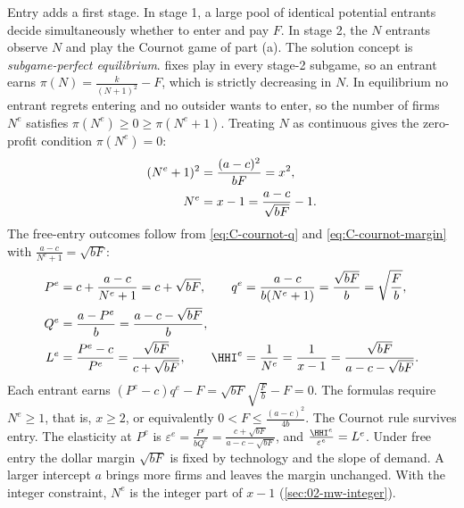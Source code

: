 Entry adds a first stage. In stage 1, a large pool of identical potential entrants decide simultaneously
whether to enter and pay $F$. In stage 2, the $N$ entrants observe $N$ and play the Cournot game of part (a).
The solution concept is \emph{subgame-perfect equilibrium}.  fixes play in every
stage-2 subgame, so an entrant earns $\pi(N) = \frac{k}{(N + 1)^2} - F$, which is strictly decreasing in $N$.
In equilibrium no entrant regrets entering and no outsider wants to enter, so the number of firms $N^e$
satisfies $\pi(N^e) \ge 0 \ge \pi(N^e + 1)$. Treating $N$ as continuous gives the zero-profit condition
$\pi(N^e) = 0$:
\begin{align}
(N^e + 1)^2 &= \frac{(a - c)^2}{bF} = x^2, \notag\\
N^e &= x - 1 = \frac{a - c}{\sqrt{bF}} - 1 . \label{eq:C-Ne}
\end{align}
The free-entry outcomes follow from \eqref{eq:C-cournot-q} and \eqref{eq:C-cournot-margin} with
$\frac{a - c}{N^e + 1} = \sqrt{bF}$:
\begin{align}
P^e &= c + \frac{a - c}{N^e + 1} = c + \sqrt{bF}, \qquad
q^e = \frac{a - c}{b(N^e + 1)} = \frac{\sqrt{bF}}{b} = \sqrt{\frac{F}{b}}, \notag\\
Q^e &= \frac{a - P^e}{b} = \frac{a - c - \sqrt{bF}}{b}, \notag\\
L^e &= \frac{P^e - c}{P^e} = \frac{\sqrt{bF}}{c + \sqrt{bF}}, \qquad
\HHI^e = \frac{1}{N^e} = \frac{1}{x - 1} = \frac{\sqrt{bF}}{a - c - \sqrt{bF}} . \label{eq:C-free-entry}
\end{align}
Each entrant earns $(P^e - c)q^e - F = \sqrt{bF}\sqrt{\frac{F}{b}} - F = 0$. The formulas require $N^e \ge 1$,
that is, $x \ge 2$, or equivalently $0 < F \le \frac{(a - c)^2}{4b}$. The Cournot rule survives entry. The elasticity at
$P^e$ is $\varepsilon^e = \frac{P^e}{bQ^e} = \frac{c + \sqrt{bF}}{a - c - \sqrt{bF}}$, and
$\frac{\HHI^e}{\varepsilon^e} = L^e$. Under free entry the dollar margin $\sqrt{bF}$ is fixed by technology
and the slope of demand. A larger intercept $a$ brings more firms and leaves the margin unchanged. With the
integer constraint, $N^e$ is the integer part of $x - 1$ (\cref{sec:02-mw-integer}).

